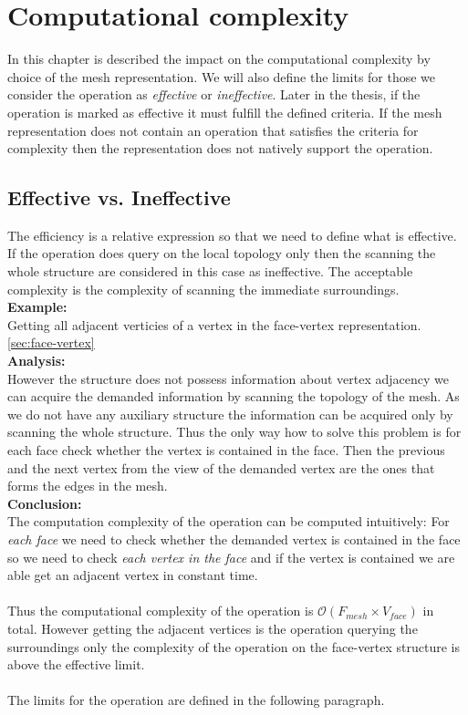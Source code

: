 \chapter{Computational complexity}

In this chapter is described the impact on the computational complexity by choice of the mesh
representation. We will also define the limits for those we consider the operation
as \emph{effective} or \emph{ineffective}. Later in the thesis, if the operation is
marked as effective it must fulfill the defined criteria. If the mesh representation
does not contain an operation that satisfies the criteria for complexity then
the representation does not natively support the operation.

\section{Effective vs. Ineffective}

The efficiency is a relative expression so that we need to define what is effective.
If the operation does query on the local topology only then the scanning the whole structure
are considered in this case as ineffective. The acceptable complexity is the complexity
of scanning the immediate surroundings.\\

\textbf{Example:}\\
Getting all adjacent verticies of a vertex in the face-vertex representation. \ref{sec:face-vertex}\\

\textbf{Analysis:}\\
However the structure does not possess information about vertex adjacency
we can acquire the demanded information by scanning the topology of the mesh.
As we do not have any auxiliary structure the information can be acquired only by
scanning the whole structure. Thus the only way how to solve this problem
is for each face check whether the vertex is contained in the face. Then the
previous and the next vertex from the view of the demanded vertex are the ones
that forms the edges in the mesh.\\

\textbf{Conclusion:}\\
The computation complexity of the operation can be computed intuitively:
For \emph{each face} we need to check whether the demanded vertex is contained in the
face so we need to check \emph{each vertex in the face} and if the vertex is contained
we are able get an adjacent vertex in constant time.\\
\\
Thus the computational complexity of the operation
is $\mathcal{O}(F_{mesh} \times V_{face})$ in total.
However getting the adjacent vertices is the operation querying the surroundings only
the complexity of the operation on the face-vertex structure is above the effective limit.\\
\\
The limits for the operation are defined in the following paragraph.

